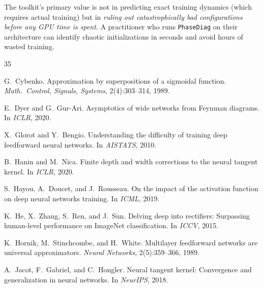 \documentclass[10pt]{article}
\theoremstyle{definition}
\begin{document}
The toolkit's primary value is not in predicting exact training dynamics (which requires actual training) but in \emph{ruling out catastrophically bad configurations before any GPU time is spent}.
A practitioner who runs \texttt{PhaseDiag} on their architecture can identify chaotic initializations in seconds and avoid hours of wasted training.

\begingroup
\renewcommand{\section}[2]{}
\begin{thebibliography}{35}

G.~Cybenko.
\newblock Approximation by superpositions of a sigmoidal function.
\newblock \emph{Math.\ Control, Signals, Systems}, 2(4):303--314, 1989.

E.~Dyer and G.~Gur-Ari.
\newblock Asymptotics of wide networks from Feynman diagrams.
\newblock In \emph{ICLR}, 2020.

X.~Glorot and Y.~Bengio.
\newblock Understanding the difficulty of training deep feedforward neural networks.
\newblock In \emph{AISTATS}, 2010.

B.~Hanin and M.~Nica.
\newblock Finite depth and width corrections to the neural tangent kernel.
\newblock In \emph{ICLR}, 2020.

S.~Hayou, A.~Doucet, and J.~Rousseau.
\newblock On the impact of the activation function on deep neural networks training.
\newblock In \emph{ICML}, 2019.

K.~He, X.~Zhang, S.~Ren, and J.~Sun.
\newblock Delving deep into rectifiers: Surpassing human-level performance on ImageNet classification.
\newblock In \emph{ICCV}, 2015.

K.~Hornik, M.~Stinchcombe, and H.~White.
\newblock Multilayer feedforward networks are universal approximators.
\newblock \emph{Neural Networks}, 2(5):359--366, 1989.

A.~Jacot, F.~Gabriel, and C.~Hongler.
\newblock Neural tangent kernel: Convergence and generalization in neural networks.
\newblock In \emph{NeurIPS}, 2018.


\end{thebibliography}
\end{document}
